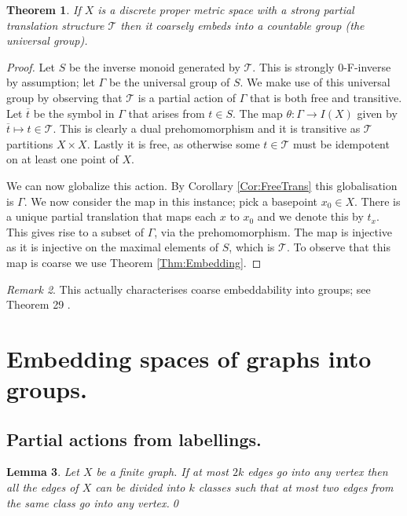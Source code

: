 \documentclass[11pt,a4paper]{amsart}
\theoremstyle{plain}
\newtheorem{theorem}{Theorem}%
\newtheorem{lemma}[theorem]{Lemma}%
\theoremstyle{definition}%
\theoremstyle{remark}%
\newtheorem{remark}[theorem]{Remark}%
\begin{document}
\begin{theorem}\label{Thm:SPTSCE}
If $X$ is a discrete proper metric space with a strong partial translation structure $\mathcal{T}$ then it coarsely embeds into a countable group (the universal group).
\end{theorem}
\begin{proof}
Let $S$ be the inverse monoid generated by $\mathcal{T}$. This is strongly $0$-F-inverse by assumption; let $\Gamma$ be the universal group of $S$. We make use of this universal group by observing that $\mathcal{T}$ is a partial action of $\Gamma$ that is both free and transitive. Let $\overline{t}$ be the symbol in $\Gamma$ that arises from $t \in S$. The map $\theta: \Gamma \rightarrow I(X)$ given by $\overline{t} \mapsto t \in \mathcal{T}$. This is clearly a dual prehomomorphism and it is transitive as $\mathcal{T}$ partitions $X\times X$. Lastly it is free, as otherwise some $t \in \mathcal{T}$ must be idempotent on at least one point of $X$.

We can now globalize this action. By Corollary \ref{Cor:FreeTrans} this globalisation is $\Gamma$. We now consider the map in this instance; pick a basepoint $x_{0} \in X$. There is a unique partial translation that maps each $x$ to $x_{0}$ and we denote this by $t_{x}$. This gives rise to a subset of $\Gamma$, via the prehomomorphism. The map is injective as it is injective on the maximal elements of $S$, which is $\mathcal{T}$. To observe that this map is coarse we use Theorem \ref{Thm:Embedding}.
\end{proof}

\begin{remark}
This actually characterises coarse embeddability into groups; see Theorem 29 \cite{}.
\end{remark}

\section{Embedding spaces of graphs into groups.}

\subsection{Partial actions from labellings.}

\begin{lemma}\label{Lem:GenPet}
Let $X$ be a finite graph. If at most $2k$ edges go into any vertex then all the edges of $X$ can be divided into $k$ classes such that at most two edges from the same class go into any vertex.\qed
\end{lemma}
\end{document}

